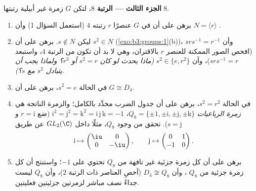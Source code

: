 \begin{problem}
\medskip
\noindent\textbf{الجزء الثالث --- الرتبة $8$.} لتكن $G$ زمرة غير
أبيلية رتبتها $8$.
\begin{enumerate}[resume]
  \item برهن على أن في $G$ عنصرًا $r$ رتبته $4$ (استعمل السؤال 1)
        وأن $N = \langle r\rangle$ .
  \item ليكن $s \notin N$. برهن على أن $s^2 \in N$
        (\cref{exo:b3:groups:1}(b))، وأن $srs^{-1} = r^{-1}$ (افحص الصور الممكنة
        للعنصر $r$ بالاقتران، وهي لا بد أن تكون من الرتبة 4، واستبعد
        $srs^{-1} = r$)، وأن $s^2 \in \{e, r^2\}$ \emph{(ماذا يحدث لو كان
        $s^2 = r$ أو $r^3$؟ ولماذا يجب أن يتبادل $s^2$ مع $s$؟)}.
  \item في الحالة $s^2 = e$، برهن على أن $G \cong D_4$.
  \item في الحالة $s^2 = r^2$، برهن على أن جدول الضرب محدَّد
        بالكامل؛ والزمرة الناتجة هي \emph{زمرة
        الرباعيات} $Q_8 =
        \{\pm 1, \pm \mathrm i, \pm \mathrm j, \pm \mathrm k\}$، $\mathrm i^2 = \mathrm j^2 = \mathrm k^2 = \mathrm i\,
        \mathrm j\,\mathrm k = -1$
        (ضع $r = \mathrm i$ و $s =
        \mathrm j$). تحقق من وجود $Q_8$،
        مثلًا داخل $GL_2(\C)$ عن طريق
        \[
        \mathrm i \mapsto \begin{pmatrix} \iu & 0\\ 0 & -\iu
        \end{pmatrix},
        \qquad
        \mathrm j \mapsto \begin{pmatrix} 0 & 1\\ -1 & 0
        \end{pmatrix}.
        \]
  \item برهن على أن كل زمرة جزئية غير تافهة من $Q_8$ تحتوي على
        $-1$؛ واستنتج أن كل زمرة جزئية من $Q_8$ ، وأن
        $D_4 \not\cong Q_8$ (أحصِ العناصر ذات الرتبة $2$)، وأن $Q_8$ ليست
        جداءً نصف مباشر لزمرتين جزئيتين فعليتين.
\end{enumerate}


\end{problem}
